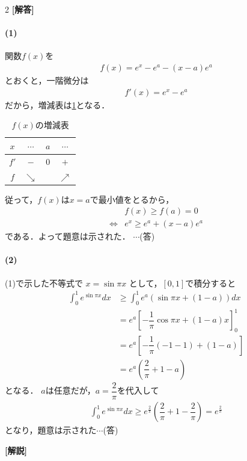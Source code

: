 \documentclass[../../main.tex]{subfiles}
\begin{document}
\setcounter{equation}{0}
\begin{oframed}
  
\end{oframed}
\setlength{\columnseprule}{0.4pt}
\begin{multicols}{2}
  {\bf [解答]}

  \paragraph{(1)}
  関数$f(x)$を
  \begin{align}
    f(x) = e^x - e^a - (x-a)e^a
  \end{align}
  とおくと，一階微分は
  \begin{align}
    f'(x) = e^x - e^a
  \end{align}
  だから，増減表は\cref{1991-6:table:1}となる．
  \begin{table}[H]
    \centering
    \caption{$f(x)$の増減表}
    \label{1991-6:table:1}
    \begin{tabular}{|c||c|c|c|}
      \hline
      $x$  & $\cdots$   & $a$ & $\cdots$   \\
      \hline
      $f'$ & $-$        & $0$ & $+$        \\
      \hline
      $f$  & $\searrow$ &     & $\nearrow$ \\
      \hline
    \end{tabular}
  \end{table}
  従って，$f(x)$は$x=a$で最小値をとるから，
  \begin{align}
    & f(x) \ge f(a) = 0      \\
    \iff
    & e^x \ge e^a + (x-a)e^a
  \end{align}
  である．よって題意は示された． $\cdots$(答)

  \paragraph{(2)}
  (1)で示した不等式で $x = \sin\pi x$ として，$[ 0, 1]$で積分すると
  \begin{align}
    \int_0^1 e^{\sin\pi x} dx & \ge \int_0^1 e^a(\sin\pi x + (1-a)) dx                    \\
    & = e^a \left[ -\dfrac{1}{\pi}\cos\pi x + (1-a)x \right]_0^1 \\
    & = e^a \left[ -\dfrac{1}{\pi}(-1-1) + (1-a) \right]         \\
    & = e^a \left( \dfrac{2}{\pi} + 1 - a  \right)
  \end{align}
  となる．
  $a$は任意だが，$a=\dfrac{2}{\pi}$を代入して
  \begin{align}
    \int_0^1 e^{\sin\pi x} dx \ge e^{\frac{2}{\pi}} \left( \dfrac{2}{\pi} + 1 - \dfrac{2}{\pi} \right) = e^{\frac{2}{\pi}}
  \end{align}
  となり，題意は示された$\cdots$(答)

  {\bf [解説]}

  \newpage
\end{multicols}
\end{document}
